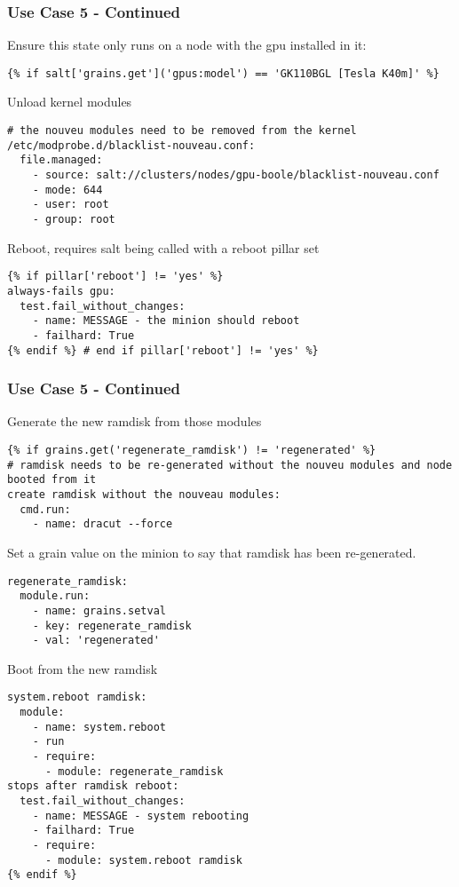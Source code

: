 \documentclass{beamer}
\begin{document}
\begin{frame}[fragile]
\frametitle{Use Case 5 - Continued}


Ensure this state only runs on a node with the gpu installed in it:\\
\begin{lstlisting}[basicstyle=\tiny,]
{% if salt['grains.get']('gpus:model') == 'GK110BGL [Tesla K40m]' %}
\end{lstlisting}

Unload kernel modules 
\begin{lstlisting}[basicstyle=\tiny,]
# the nouveu modules need to be removed from the kernel
/etc/modprobe.d/blacklist-nouveau.conf:
  file.managed:
    - source: salt://clusters/nodes/gpu-boole/blacklist-nouveau.conf
    - mode: 644
    - user: root
    - group: root
\end{lstlisting}
Reboot, requires salt being called with a reboot pillar set
\begin{lstlisting}[basicstyle=\tiny,]
{% if pillar['reboot'] != 'yes' %}
always-fails gpu:
  test.fail_without_changes:
    - name: MESSAGE - the minion should reboot 
    - failhard: True
{% endif %} # end if pillar['reboot'] != 'yes' %}
\end{lstlisting}
\end{frame}

\begin{frame}[fragile]
\frametitle{Use Case 5 - Continued}

Generate the new ramdisk from those modules\\

\begin{lstlisting}[basicstyle=\tiny,]
{% if grains.get('regenerate_ramdisk') != 'regenerated' %}
# ramdisk needs to be re-generated without the nouveu modules and node booted from it
create ramdisk without the nouveau modules:
  cmd.run:
    - name: dracut --force
\end{lstlisting}

Set a grain value on the minion to say that ramdisk has been re-generated.\\

\begin{lstlisting}[basicstyle=\tiny,]
regenerate_ramdisk:
  module.run:
    - name: grains.setval
    - key: regenerate_ramdisk
    - val: 'regenerated'
\end{lstlisting}

Boot from the new ramdisk\\

\begin{lstlisting}[basicstyle=\tiny,]
system.reboot ramdisk:
  module:
    - name: system.reboot
    - run
    - require:
      - module: regenerate_ramdisk
stops after ramdisk reboot:
  test.fail_without_changes:
    - name: MESSAGE - system rebooting
    - failhard: True
    - require:
      - module: system.reboot ramdisk
{% endif %}
\end{lstlisting}
\end{frame}
\end{document}
